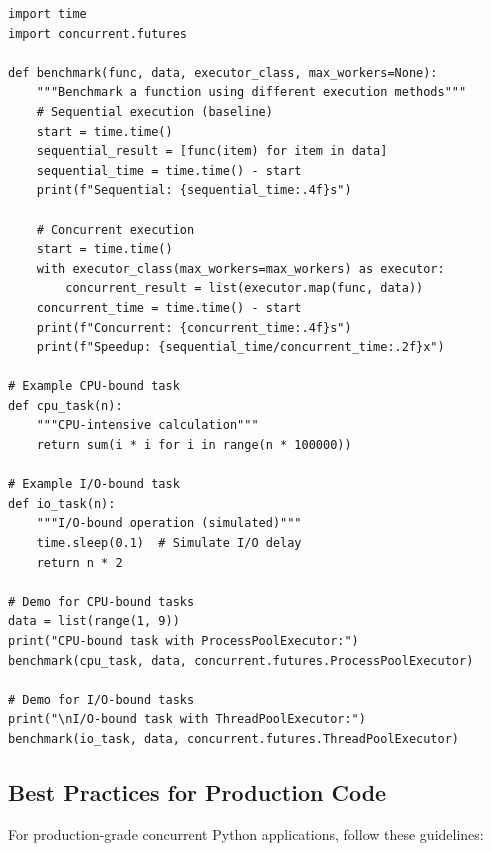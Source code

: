 \documentclass[12pt,letterpaper]{article}
\newenvironment{macterminal}{%
    \begin{mdframed}[
        linecolor=terminalFrame,
        backgroundcolor=terminalBg,
        roundcorner=5pt,
        skipabove=10pt,
        skipbelow=10pt,
        linewidth=1pt,
        innertopmargin=10pt, %
        frametitle={%
            \tikz[baseline=(current bounding box.east), outer sep=0pt]{
                \fill[red!80!black] (0,0) circle (5pt);
                \fill[yellow!80!black] (0.7,0) circle (5pt);
                \fill[green!70!black] (1.4,0) circle (5pt);
            }
        },
        frametitlealignment=\raggedright, %
        frametitleaboveskip=8pt, %
        frametitlebelowskip=0pt, %
    ]
}{%
    \end{mdframed}%
}
\begin{document}
\begin{macterminal}
\begin{lstlisting}
import time
import concurrent.futures

def benchmark(func, data, executor_class, max_workers=None):
    """Benchmark a function using different execution methods"""
    # Sequential execution (baseline)
    start = time.time()
    sequential_result = [func(item) for item in data]
    sequential_time = time.time() - start
    print(f"Sequential: {sequential_time:.4f}s")
    
    # Concurrent execution
    start = time.time()
    with executor_class(max_workers=max_workers) as executor:
        concurrent_result = list(executor.map(func, data))
    concurrent_time = time.time() - start
    print(f"Concurrent: {concurrent_time:.4f}s")
    print(f"Speedup: {sequential_time/concurrent_time:.2f}x")

# Example CPU-bound task
def cpu_task(n):
    """CPU-intensive calculation"""
    return sum(i * i for i in range(n * 100000))

# Example I/O-bound task
def io_task(n):
    """I/O-bound operation (simulated)"""
    time.sleep(0.1)  # Simulate I/O delay
    return n * 2

# Demo for CPU-bound tasks
data = list(range(1, 9))
print("CPU-bound task with ProcessPoolExecutor:")
benchmark(cpu_task, data, concurrent.futures.ProcessPoolExecutor)

# Demo for I/O-bound tasks
print("\nI/O-bound task with ThreadPoolExecutor:")
benchmark(io_task, data, concurrent.futures.ThreadPoolExecutor)
\end{lstlisting}
\end{macterminal}

\subsection{Best Practices for Production Code}

For production-grade concurrent Python applications, follow these guidelines:
\end{document}
